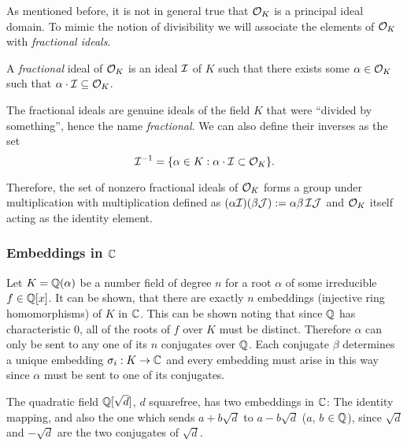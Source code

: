As mentioned before, it is not in general true that $\mathcal{O}_K$ is a principal ideal domain. To mimic the notion of divisibility we will associate the elements of $\mathcal{O}_K$ with \textit{fractional ideals}.
\begin{definition}
	A \textit{fractional} ideal of $\mathcal{O}_K$ is an ideal $\mathcal{I}$ of $K$ such that there exists some $\alpha \in \mathcal{O}_K$ such that $\alpha \cdot \mathcal{I} \subseteq \mathcal{O}_K$.
\end{definition}
The fractional ideals are genuine ideals of the field $K$ that were ``divided by something'', hence the name \textit{fractional}. We can also define their inverses as the set
\[ \mathcal{I}^{-1} = \{ \alpha \in K : \alpha \cdot \mathcal{I} \subset \mathcal{O}_K \}. \]

Therefore, the set of nonzero fractional ideals of $\mathcal{O}_K$ forms a group under multiplication with multiplication defined as $(\alpha \mathcal{I})(\beta \mathcal{J}) := \alpha \beta \, \mathcal{I} \mathcal{J}$ and $\mathcal{O}_K$ itself acting as the identity element. %

\subsubsection*{Embeddings in $\mathbb{C}$} 
Let $K = \mathbb{Q}(\alpha)$ be a number field of degree $n$ for a root $\alpha$ of some irreducible $f \in \mathbb{Q}[x]$. It can be shown, that there are exactly $n$ embeddings (injective ring homomorphisms) of $K$ in $\mathbb{C}$. This can be shown noting that since $\mathbb{Q}$ has characteristic 0, all of the roots of $f$ over $K$ must be distinct. Therefore $\alpha$ can only be sent to any one of its $n$ conjugates over $\mathbb{Q}$. Each conjugate $\beta$ determines a unique embedding $\sigma_i: K \rightarrow \mathbb{C}$ and every embedding must arise in this way since $\alpha$ must be sent to one of its conjugates.

\begin{example}
    The quadratic field $\mathbb{Q}[\sqrt{d}]$, $d$ squarefree, has two embeddings in $\mathbb{C}$: The identity mapping, and also the one which sends $a + b\sqrt{d}$ to $a - b\sqrt{d}$ ($a$, $b$ $\in \mathbb{Q}$), since $\sqrt{d}$ and $-\sqrt{d}$ are the two conjugates of $\sqrt{d}$.
\end{example}
 

